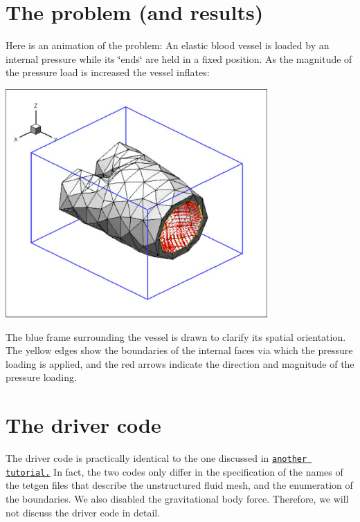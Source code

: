  

\hypertarget{index_problem}{}\section{The problem (and results)}\label{index_problem}
Here is an animation of the problem\+: An elastic blood vessel is loaded by an internal pressure while its \char`\"{}ends\char`\"{} are held in a fixed position. As the magnitude of the pressure load is increased the vessel inflates\+:

 
\begin{DoxyImage}
\includegraphics[width=0.75\textwidth]{inflating_iliac}
\end{DoxyImage}


The blue frame surrounding the vessel is drawn to clarify its spatial orientation. The yellow edges show the boundaries of the internal faces via which the pressure loading is applied, and the red arrows indicate the direction and magnitude of the pressure loading.



 

\hypertarget{index_driver}{}\section{The driver code}\label{index_driver}
The driver code is practically identical to the one discussed in \href{../../unstructured_three_d_solid/html/index.html}{\tt another tutorial.} In fact, the two codes only differ in the specification of the names of the tetgen files that describe the unstructured fluid mesh, and the enumeration of the boundaries. We also disabled the gravitational body force. Therefore, we will not discuss the driver code in detail.



